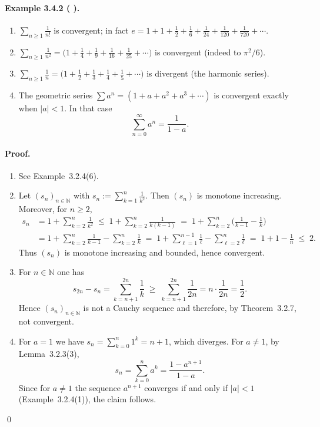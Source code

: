 \documentclass[12pt,a4paper]{article}
\newcommand{\N}{\mathbb{N}}
\newcommand{\NumberedExample}[3]{%
\paragraph*{Example #1 ( #2 ).} #3\par}
\theoremstyle{plain}
\theoremstyle{definition}
\theoremstyle{remark}
\begin{document}
\NumberedExample{3.4.2}{}{\begin{enumerate}[label={(\arabic*)}, leftmargin=*]
	\item $\displaystyle \sum_{n\ge 1} \frac{1}{n!}$ is convergent; in fact $e = 1 + 1 + \tfrac12 + \tfrac16 + \tfrac{1}{24} + \tfrac{1}{120} + \tfrac{1}{720} + \cdots$.

	\item $\displaystyle \sum_{n\ge 1} \frac{1}{n^2} = \Big(1 + \tfrac{1}{4} + \tfrac{1}{9} + \tfrac{1}{16} + \tfrac{1}{25} + \cdots\Big)$ is convergent (indeed to $\pi^2/6$).

	\item $\displaystyle \sum_{n\ge 1} \frac{1}{n} = \big(1 + \tfrac{1}{2} + \tfrac{1}{3} + \tfrac{1}{4} + \tfrac{1}{5} + \cdots\big)$ is divergent (the harmonic series).

	\item The geometric series $\sum a^n = (1 + a + a^2 + a^3 + \cdots)$ is convergent exactly when $|a|<1$. In that case
	\[
		\sum_{n=0}^{\infty} a^n = \frac{1}{1-a}.
	\]
\end{enumerate}}

\paragraph{Proof.}
\begin{enumerate}[label={(\arabic*)}, leftmargin=*]
	\item See Example~3.2.4(6).

	\item Let $(s_n)_{n\in\N}$ with $s_n := \sum_{k=1}^{n} \tfrac{1}{k^2}$. Then $(s_n)$ is monotone increasing. Moreover, for $n\ge2$,
	\begin{align*}
		s_n &= 1 + \sum_{k=2}^{n} \frac{1}{k^2}
			\;\le\; 1 + \sum_{k=2}^{n} \frac{1}{k(k-1)}
			\;=\; 1 + \sum_{k=2}^{n} \Big( \frac{1}{k-1} - \frac{1}{k} \Big) \\
			&= 1 + \sum_{k=2}^{n} \frac{1}{k-1} - \sum_{k=2}^{n} \frac{1}{k}
			\;=\; 1 + \sum_{\ell=1}^{n-1} \frac{1}{\ell} - \sum_{\ell=2}^{n} \frac{1}{\ell}
			\;=\; 1 + 1 - \frac{1}{n}
			\;\le\; 2.
	\end{align*}
	Thus $(s_n)$ is monotone increasing and bounded, hence convergent.

	\item For $n\in\N$ one has
	\[
		s_{2n} - s_n 
			= \sum_{k=n+1}^{2n} \frac{1}{k}
			\;\ge\; \sum_{k=n+1}^{2n} \frac{1}{2n}
			= n\cdot\frac{1}{2n}
			= \frac{1}{2}.
	\]
	Hence $(s_n)_{n\in\N}$ is not a Cauchy sequence and therefore, by Theorem~3.2.7, not convergent.

	\item For $a=1$ we have $s_n = \sum_{k=0}^{n} 1^k = n+1$, which diverges. For $a\ne1$, by Lemma~3.2.3(3),
	\[
		s_n = \sum_{k=0}^{n} a^k = \frac{1-a^{n+1}}{1-a}.
	\]
	Since for $a\ne1$ the sequence $a^{n+1}$ converges if and only if $|a|<1$ (Example~3.2.4(1)), the claim follows.
\end{enumerate}
\qed
\end{document}
